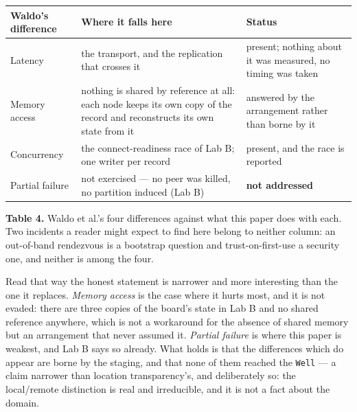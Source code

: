 \documentclass[
]{article}
\newcounter{none} %
\begin{document}
{\def\LTcaptype{none} %
\begin{longtable}[]{@{}
  >{\raggedright\arraybackslash}p{}
  >{\raggedright\arraybackslash}p{}
  >{\raggedright\arraybackslash}p{}@{}}
\toprule\noalign{}
\begin{minipage}[b]{\linewidth}\raggedright
Waldo's difference
\end{minipage} & \begin{minipage}[b]{\linewidth}\raggedright
Where it falls here
\end{minipage} & \begin{minipage}[b]{\linewidth}\raggedright
Status
\end{minipage} \\
\midrule\noalign{}
\endhead
\bottomrule\noalign{}
\endlastfoot
Latency & the transport, and the replication that crosses it & present;
nothing about it was measured, no timing was taken \\
Memory access & nothing is shared by reference at all: each node keeps
its own copy of the record and reconstructs its own state from it &
answered by the arrangement rather than borne by it \\
Concurrency & the connect-readiness race of Lab B; one writer per record
& present, and the race is reported \\
Partial failure & not exercised --- no peer was killed, no partition
induced (Lab B) & \textbf{not addressed} \\
\end{longtable}
}

\textbf{Table 4.} Waldo et al.'s four differences against what this
paper does with each. Two incidents a reader might expect to find here
belong to neither column: an out-of-band rendezvous is a bootstrap
question and trust-on-first-use a security one, and neither is among the
four.

Read that way the honest statement is narrower and more interesting than
the one it replaces. \emph{Memory access} is the case where it hurts
most, and it is not evaded: there are three copies of the board's state
in Lab B and no shared reference anywhere, which is not a workaround for
the absence of shared memory but an arrangement that never assumed it.
\emph{Partial failure} is where this paper is weakest, and Lab B says so
already. What holds is that the differences which do appear are borne by
the staging, and that none of them reached the \texttt{Well} --- a claim
narrower than location transparency's, and deliberately so: the
local/remote distinction is real and irreducible, and it is not a fact
about the domain.
\end{document}
